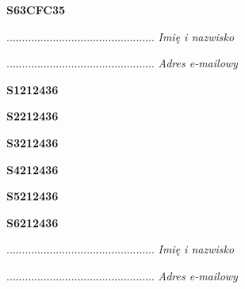 \begin{turn}{90}\huge \textbf{S63CFC35}\end{turn}

\begin{turn}{90}\begin{minipage}{\linewidth} \vspace{20mm} ................................................  \textit{Imię i nazwisko}\end{minipage}\end{turn}

\begin{turn}{90}\begin{minipage}{\linewidth} \vspace{20mm} ................................................  \textit{Adres e-mailowy}\end{minipage}\end{turn}

\begin{turn}{90}\huge \textbf{S1212436}\end{turn}

\begin{turn}{90}\huge \textbf{S2212436}\end{turn}

\begin{turn}{90}\huge \textbf{S3212436}\end{turn}

\begin{turn}{90}\huge \textbf{S4212436}\end{turn}

\begin{turn}{90}\huge \textbf{S5212436}\end{turn}

\begin{turn}{90}\huge \textbf{S6212436}\end{turn}

\begin{turn}{90}\begin{minipage}{\linewidth} \vspace{20mm} ................................................  \textit{Imię i nazwisko}\end{minipage}\end{turn}

\begin{turn}{90}\begin{minipage}{\linewidth} \vspace{20mm} ................................................  \textit{Adres e-mailowy}\end{minipage}\end{turn}

